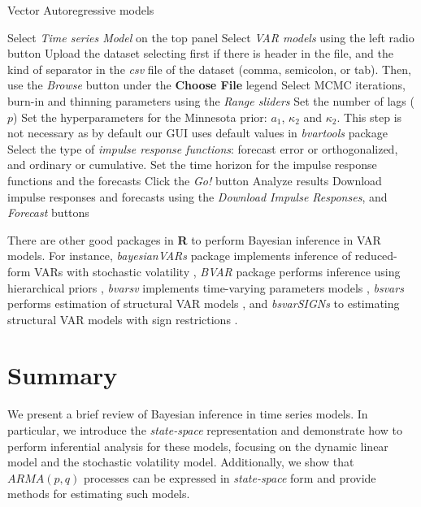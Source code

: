 \begin{algorithm}[h!]
	\caption{Vector Autoregressive models}\label{alg:VAR}
	\begin{algorithmic}[1]  		 			
		\State Select \textit{Time series Model} on the top panel
		\State Select \textit{VAR models} using the left radio button
		\State Upload the dataset selecting first if there is header in the file, and the kind of separator in the \textit{csv} file of the dataset (comma, semicolon, or tab). Then, use the \textit{Browse} button under the \textbf{Choose File} legend
		\State Select MCMC iterations, burn-in and thinning parameters using the \textit{Range sliders}
		\State Set the number of lags ($p$)
		\State Set the hyperparameters for the Minnesota prior: $a_1$, $\kappa_2$ and $\kappa_2$. This step is not necessary as by default our GUI uses default values in \textit{bvartools} package
		\State Select the type of \textit{impulse response functions}: forecast error or orthogonalized, and ordinary or cumulative.
		\State Set the time horizon for the impulse response functions and the forecasts 
		\State Click the \textit{Go!} button
		\State Analyze results
		\State Download impulse responses and forecasts using the \textit{Download Impulse Responses}, and \textit{Forecast} buttons
	\end{algorithmic} 
\end{algorithm}

 There are other good packages in \textbf{R} to perform Bayesian inference in VAR models. For instance, \textit{bayesianVARs} package implements inference of reduced-form VARs with stochastic volatility \cite{Gruber2024}, \textit{BVAR} package performs inference using hierarchical priors \cite{Kuschnig2024}, \textit{bvarsv} implements time-varying parameters models \cite{Krueger2022}, \textit{bsvars} performs estimation of structural VAR models \cite{Tomasz2024}, and \textit{bsvarSIGNs} to estimating structural VAR models with sign restrictions \cite{Wang2024}. 
 
\section{Summary}\label{sec85}
We present a brief review of Bayesian inference in time series models. In particular, we introduce the \textit{state-space} representation and demonstrate how to perform inferential analysis for these models, focusing on the dynamic linear model and the stochastic volatility model. Additionally, we show that $ARMA(p,q)$ processes can be expressed in \textit{state-space} form and provide methods for estimating such models. 

